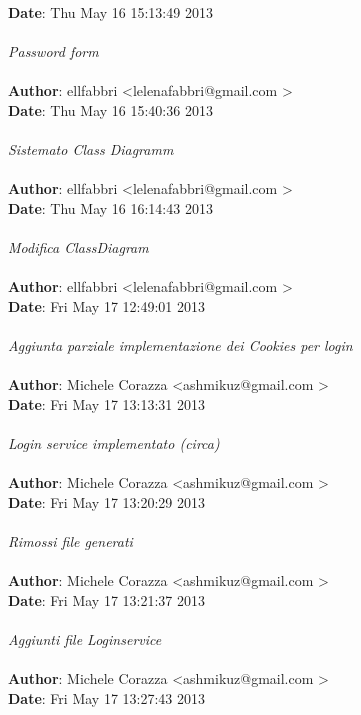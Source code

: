 \documentclass[a4paper,12pt]{article} %
\begin{document}
\textbf{Date}:   Thu May 16 15:13:49 2013 \\
\\
    \emph{Password form}\\
\\
\textbf{Author}: ellfabbri \textless lelenafabbri@gmail.com \textgreater \\
\textbf{Date}:   Thu May 16 15:40:36 2013 \\
\\
    \emph{Sistemato Class Diagramm}\\
\\
\textbf{Author}: ellfabbri \textless lelenafabbri@gmail.com \textgreater \\
\textbf{Date}:   Thu May 16 16:14:43 2013 \\
\\
    \emph{Modifica ClassDiagram}\\
\\
\textbf{Author}: ellfabbri \textless lelenafabbri@gmail.com \textgreater \\
\textbf{Date}:   Fri May 17 12:49:01 2013 \\
\\
    \emph{Aggiunta parziale implementazione dei Cookies per login}\\
\\
\textbf{Author}: Michele Corazza \textless ashmikuz@gmail.com \textgreater \\
\textbf{Date}:   Fri May 17 13:13:31 2013 \\
\\
    \emph{Login service implementato (circa)}\\
\\
\textbf{Author}: Michele Corazza \textless ashmikuz@gmail.com \textgreater \\
\textbf{Date}:   Fri May 17 13:20:29 2013 \\
\\
    \emph{Rimossi file generati}\\
\\
\textbf{Author}: Michele Corazza \textless ashmikuz@gmail.com \textgreater \\
\textbf{Date}:   Fri May 17 13:21:37 2013 \\
\\
    \emph{Aggiunti file Loginservice}\\
\\
\textbf{Author}: Michele Corazza \textless ashmikuz@gmail.com \textgreater \\
\textbf{Date}:   Fri May 17 13:27:43 2013 \\
\end{document}

